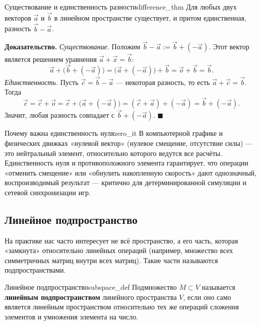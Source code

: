 \documentclass[12pt,a4paper]{article}
\newenvironment{myproof}{\noindent\textbf{Доказательство.}}{\hfill$\blacksquare$}
\begin{document}
\begin{theorem}{Существование и единственность разности}{difference_thm}
Для любых двух векторов $\vec{a}$ и $\vec{b}$ в линейном пространстве
существует, и притом единственная, разность $\vec{b} - \vec{a}$.
\end{theorem}

\begin{myproof}
\textit{Существование.} Положим $\vec{b} - \vec{a} := \vec{b} + (-\vec{a})$.
Этот вектор является решением уравнения $\vec{a} + \vec{x} = \vec{b}$:
\[
\vec{a} + \big(\vec{b} + (-\vec{a})\big)
= \big(\vec{a} + (-\vec{a})\big) + \vec{b}
= \vec{o} + \vec{b} = \vec{b}.
\]
\textit{Единственность.} Пусть $\vec{c} = \vec{b} - \vec{a}$ — некоторая
разность, то есть $\vec{a} + \vec{c} = \vec{b}$. Тогда
\[
\vec{c} = \vec{c} + \vec{o} = \vec{c} + \big(\vec{a} + (-\vec{a})\big)
= (\vec{c} + \vec{a}) + (-\vec{a}) = \vec{b} + (-\vec{a}).
\]
Значит, любая разность совпадает с $\vec{b} + (-\vec{a})$.
\end{myproof}

\begin{remarkIT}{Почему важна единственность нуля}{zero_it}
В компьютерной графике и физических движках «нулевой вектор» (нулевое
смещение, отсутствие силы) — это нейтральный элемент, относительно
которого ведутся все расчёты. Единственность нуля и противоположного
элемента гарантирует, что операции «отменить смещение» или
«обнулить накопленную скорость» дают однозначный, воспроизводимый
результат — критично для детерминированной симуляции и сетевой
синхронизации игр.
\end{remarkIT}

\subsection*{Линейное подпространство}

На практике нас часто интересует не всё пространство, а его часть,
которая «замкнута» относительно линейных операций (например, множество
всех симметричных матриц внутри всех матриц). Такие части называются
подпространствами.

\begin{definition}{Линейное подпространство}{subspace_def}
Подмножество $M \subset V$ называется \textbf{линейным
подпространством} линейного пространства $V$, если оно само является
линейным пространством относительно тех же операций сложения
элементов и умножения элемента на число.
\end{definition}
\end{document}
